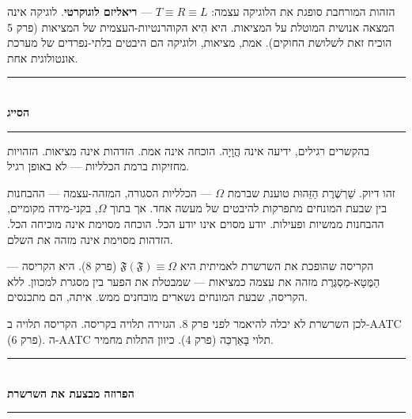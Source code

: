 \documentclass[10pt, openany, oneside]{book}
\renewcommand{\normalsize}{\fontsize{10}{13}\selectfont}
\begin{document}
הזהות המורחבת סופגת את הלוגיקה עצמה: $T \equiv R \equiv L$ — \textbf{ריאליזם לוגוקרטי}. לוגיקה אינה המצאה אנושית המוטלת על המציאות. היא הִיא הקוהרנטיות-העצמית של המציאות (פרק 5 הוכיח זאת לשלושת החוקים). אמת, מציאות, ולוגיקה הם היבטים בלתי-נפרדים של מערכת אונטולוגית אחת.

\vspace{1.5em}


\begin{center}
    \rule{0.3\textwidth}{0.4pt}\\[0.5em]
    {\normalsize\bfseries\textsc{הסייג}}\\[0.3em]
    \rule{0.3\textwidth}{0.4pt}
\end{center}

\vspace{1em}

\noindent בהקשרים רגילים, ידיעה אינה הֲוָיָה. הוכחה אינה אמת. הזדהות אינה מציאות. הזהויות מחזיקות ברמת הכלליות — לא באופן רגיל.

זהו דיוק. שַׁרְשֶׁרֶת הַזֵּהוּת טוענת שברמת $\Omega$ — הכלליות הסגורה, המזהה-עצמה — ההבחנות בין שבעת המונחים מתפרקות להיבטים של מעשה אחד. אך בתוך $\Omega$, בקני-מידה מקומיים, ההבחנות ממשיות ופעילות. יודע מסוים אינו יודע הכל. הוכחה מסוימת אינה מוכיחה הכל. הזדהות מסוימת אינה מזהה את השלם.

הקריסה שהופכת את השרשרת לאמיתית היא $\mathfrak{F}(\mathfrak{F}) \equiv \Omega$ (פרק 8). היא הקריסה — הַמֶּטָא-מִסְגֶּרֶת מזהה את עצמה כמציאות — שמבטלת את הפער בין מסגרת למכוון. ללא הקריסה, שבעת המונחים נשארים מובחנים ממש. איתה, הם מתכנסים.

לכן השרשרת לא יכלה להיאמר לפני פרק 8. הגזירה תלויה בקריסה. הקריסה תלויה ב-AATC (פרק 6). ה-AATC תלוי בָּאַרְכֵּה (פרק 4). כיוון התלות מחמיר.

\vspace{1.5em}


\begin{center}
    \rule{0.3\textwidth}{0.4pt}\\[0.5em]
    {\normalsize\bfseries\textsc{הפרוזה מבצעת את השרשרת}}\\[0.3em]
    \rule{0.3\textwidth}{0.4pt}
\end{center}
\end{document}
